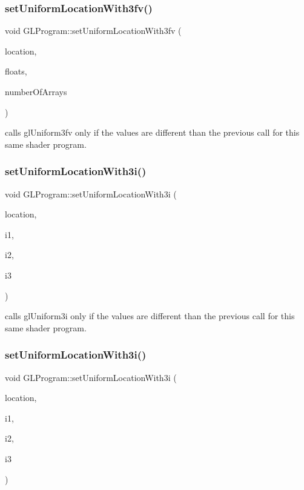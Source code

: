 \subsubsection{\texorpdfstring{set\+Uniform\+Location\+With3fv()}{setUniformLocationWith3fv()}\hspace{0.1cm}{\footnotesize\ttfamily [2/2]}}
{\footnotesize\ttfamily void G\+L\+Program\+::set\+Uniform\+Location\+With3fv (\begin{DoxyParamCaption}\item[{G\+Lint}]{location,  }\item[{const G\+Lfloat $\ast$}]{floats,  }\item[{unsigned int}]{number\+Of\+Arrays }\end{DoxyParamCaption})}

calls gl\+Uniform3fv only if the values are different than the previous call for this same shader program. \mbox{\label{classGLProgram_a7488acc88c3b6376c714d6b9cd242f31}} 
\subsubsection{\texorpdfstring{set\+Uniform\+Location\+With3i()}{setUniformLocationWith3i()}\hspace{0.1cm}{\footnotesize\ttfamily [1/2]}}
{\footnotesize\ttfamily void G\+L\+Program\+::set\+Uniform\+Location\+With3i (\begin{DoxyParamCaption}\item[{G\+Lint}]{location,  }\item[{G\+Lint}]{i1,  }\item[{G\+Lint}]{i2,  }\item[{G\+Lint}]{i3 }\end{DoxyParamCaption})}

calls gl\+Uniform3i only if the values are different than the previous call for this same shader program. \mbox{\label{classGLProgram_a7488acc88c3b6376c714d6b9cd242f31}} 
\subsubsection{\texorpdfstring{set\+Uniform\+Location\+With3i()}{setUniformLocationWith3i()}\hspace{0.1cm}{\footnotesize\ttfamily [2/2]}}
{\footnotesize\ttfamily void G\+L\+Program\+::set\+Uniform\+Location\+With3i (\begin{DoxyParamCaption}\item[{G\+Lint}]{location,  }\item[{G\+Lint}]{i1,  }\item[{G\+Lint}]{i2,  }\item[{G\+Lint}]{i3 }\end{DoxyParamCaption})}

